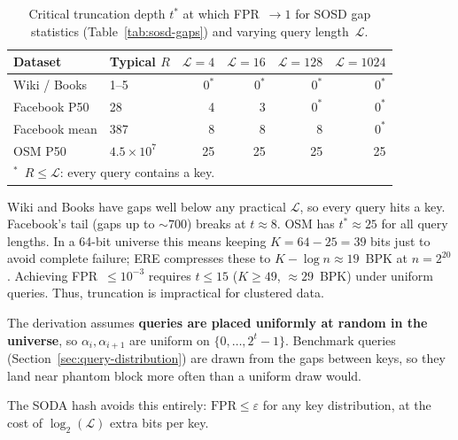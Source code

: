 \begin{table}[H]
    \centering
    \begin{tabular}{@{}llrrrr@{}}
        \toprule
        Dataset       & Typical $R$     & $\mathcal{L}=4$ & $\mathcal{L}=16$ & $\mathcal{L}=128$ & $\mathcal{L}=1024$ \\
        \midrule
        Wiki / Books  & 1--5            & $0^*$           & $0^*$            & $0^*$             & $0^*$              \\
        Facebook P50  & 28              & 4               & 3                & $0^*$             & $0^*$              \\
        Facebook mean & 387             & 8               & 8                & 8                 & $0^*$              \\
        OSM P50       & $4.5\times10^7$ & 25              & 25               & 25                & 25                 \\
        \bottomrule
        \multicolumn{6}{l}{\footnotesize ${}^{*}$~$R \leq \mathcal{L}$: every query contains a key.}
    \end{tabular}
    \caption{Critical truncation depth $t^*$ at which FPR~$\to 1$ for SOSD gap statistics
        (Table~\ref{tab:sosd-gaps}) and varying query length~$\mathcal{L}$.}
    \label{tab:trunc-breakdown}
\end{table}

Wiki and Books have gaps well below any practical $\mathcal{L}$, so every query hits a key.
Facebook's tail (gaps up to ${\sim}700$) breaks at $t \approx 8$.
OSM has $t^* \approx 25$ for all query lengths.
In a 64-bit universe this means keeping $K = 64 - 25 = 39$ bits just to avoid complete failure;
ERE compresses these to $K - \log n \approx 19$~BPK at $n = 2^{20}$.
Achieving FPR~$\leq 10^{-3}$ requires $t \leq 15$ ($K \geq 49$, $\approx 29$~BPK) under uniform queries.
Thus, truncation is impractical for clustered data.

\begin{remark}
    The derivation assumes \textbf{queries are placed uniformly at random in the universe},
    so $\alpha_i, \alpha_{i+1}$ are uniform on $\{0, \ldots, 2^t-1\}$.
    Benchmark queries (Section~\ref{sec:query-distribution}) are drawn from the gaps
    between keys, so they land near phantom block more often than a uniform draw would.
\end{remark}

The SODA hash avoids this entirely: $\mathrm{FPR} \leq \varepsilon$ for any key distribution, at the cost of
$\log_2(\mathcal{L})$ extra bits per key.

